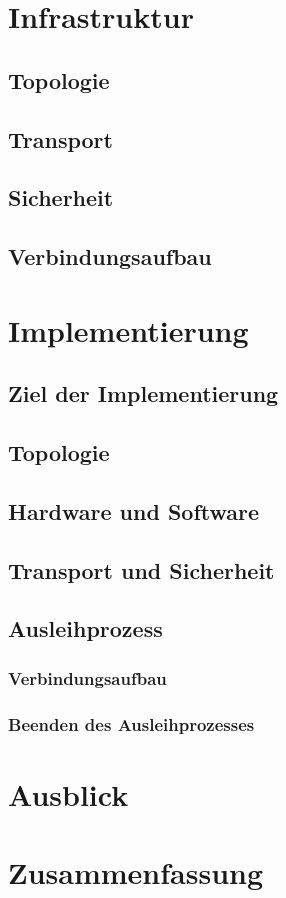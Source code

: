 \documentclass[doktyp=barbeit]{TUBAFarbeiten}
\begin{document}
\newpage
\section{Infrastruktur}
	

	\subsection{Topologie}
		

	\subsection{Transport}
		

	\subsection{Sicherheit}

	\subsection{Verbindungsaufbau}

\newpage
\section{Implementierung}

	\subsection{Ziel der Implementierung}

	\subsection{Topologie}

	\subsection{Hardware und Software}

	\subsection{Transport und Sicherheit}

	\subsection{Ausleihprozess}

		\subsubsection{Verbindungsaufbau}

		\subsubsection{Beenden des Ausleihprozesses}

\newpage
\section{Ausblick}

\newpage
\section{Zusammenfassung}

\newpage
\printbibliography[heading=bibintoc]
\end{document}
